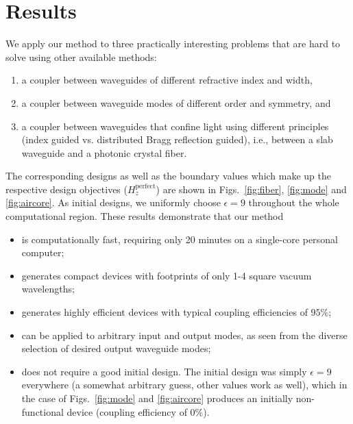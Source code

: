 \documentclass[letterpaper,10pt]{article}
\begin{document}
\section{Results}
We apply our method to three practically interesting problems 
    that are hard to solve using other available methods: 
    \begin{enumerate}
    \item a coupler between waveguides of different refractive index and width,
    \item a coupler between waveguide modes of different order and symmetry, and
    \item a coupler between waveguides that confine light 
        using different principles 
        (index guided vs. distributed Bragg reflection guided), 
        i.e., between a slab waveguide and a photonic crystal fiber. 
    \end{enumerate}

The corresponding designs as well as the boundary values which make up the
    respective design objectives ($H_z^\text{perfect}$) 
    are shown in Figs.~\ref{fig:fiber}, \ref{fig:mode} and \ref{fig:aircore}.
As initial designs, we uniformly choose $\epsilon = 9$ throughout 
    the whole computational region.
These results demonstrate that our method
    \begin{itemize}
    \item is computationally fast, 
        requiring only 20 minutes on a single-core personal computer;
    \item generates compact devices with footprints of only
        1-4 square vacuum wavelengths;
    \item generates highly efficient devices with  
        typical coupling efficiencies of $95\%$;
    \item can be applied to arbitrary input and output modes,
        as seen from the diverse selection of desired output waveguide modes;
    \item does not require a good initial design.
        The initial design was simply $\epsilon = 9$ everywhere
            (a somewhat arbitrary guess, other values work as well),
            which in the case of Figs.~\ref{fig:mode} and \ref{fig:aircore}
            produces an initially non-functional device 
            (coupling efficiency of $0\%$).

    \end{itemize}
\end{document}
